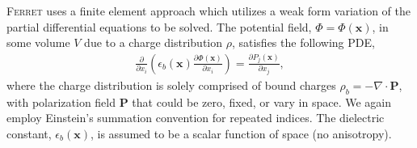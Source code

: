 \documentclass[22pt]{article} %
\begin{document}
%
\textsc{Ferret} uses a finite element approach which utilizes a weak form variation of the partial differential equations to be solved.
%
The potential field, $\Phi = \Phi(\textbf{x})$, in some volume $V$ due to a charge distribution $\rho$, satisfies the following PDE,
%
\begin{align}\label{eq:poisson_problem_1}
\frac{\partial}{\partial x_i} \left(\epsilon_b(\textbf{x}) \frac{\partial \Phi(\textbf{x})}{\partial x_i}\right) = \frac{\partial P_j(\textbf{x})}{\partial x_j},
\end{align}
%
where the charge distribution is solely comprised of bound charges $\rho_b = -\nabla \cdot \textbf{P}$, with polarization field $\textbf{P}$ that could be zero, fixed, or vary in space.
%
%
We again employ Einstein's summation convention for repeated indices. 
%
The dielectric constant, $\epsilon_b(\textbf{x})$, is assumed to be a scalar function of space (no anisotropy).
%
%
\end{document}
